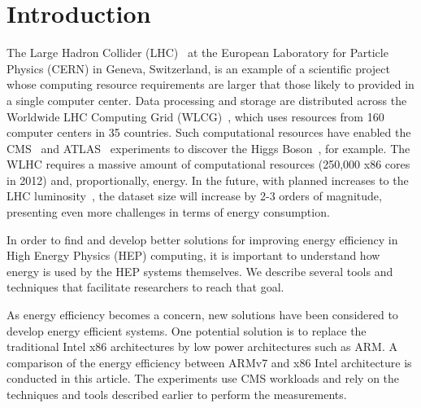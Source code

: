 \documentclass[a4paper]{jpconf}
\begin{document}
\section{Introduction}

The Large Hadron Collider (LHC)~\cite{LHCPAPER} at the European
Laboratory for Particle Physics (CERN) in Geneva, Switzerland, is
an example of a scientific project whose computing resource requirements are
larger that those likely to provided in a single
computer center. Data processing and storage are distributed
across the Worldwide LHC Computing Grid (WLCG)~\cite{WLHC}, which
uses resources from 160 computer centers in 35 countries.
Such computational resources have enabled the
CMS~\cite{CMSDET} and ATLAS~\cite{ATLAS} experiments 
to discover the Higgs Boson~\cite{CMSHIGGS,
ATLASHIGGS}, for example. The WLHC requires
a massive amount of computational resources (250,000 x86 cores in
2012) and, proportionally,
energy. 
In the future, with planned increases to the LHC luminosity~\cite{HLLHC},
the dataset size will increase by 2-3 orders of magnitude, presenting even 
more challenges in terms of energy consumption. 


In order to find and develop better solutions for improving energy
efficiency in High Energy Physics (HEP) computing, it is important to understand
how energy is used by the HEP systems themselves. We describe several
tools and techniques that facilitate researchers to reach that goal.

As energy efficiency becomes a concern, new solutions have been
considered to develop energy efficient systems. One potential
solution is to replace the traditional Intel x86 architectures by
low power architectures such as ARM. A comparison of the energy
efficiency between ARMv7 and x86 Intel architecture is conducted
in this article. The experiments use CMS workloads and rely on the
techniques and tools described earlier to perform the measurements.
\end{document}
